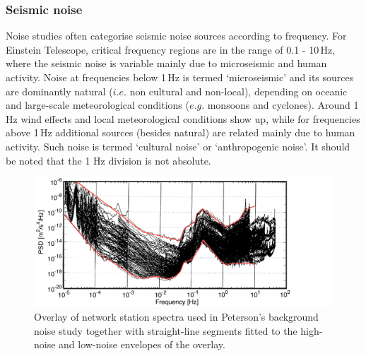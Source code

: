 \subsubsection{Seismic noise}
\label{SeismicNoise}
Noise studies \cite{Bard2003, Gutenberg1958, Asten1984, Peck2008} often categorise seismic noise sources according to frequency. For Einstein Telescope, critical frequency regions are in the range of 0.1 - 10\,Hz, where the seismic noise is variable mainly due to microseismic and human activity. Noise at frequencies below 1\,Hz is termed `microseismic' and its sources are dominantly natural ($i.e.$ non cultural and non-local), depending on oceanic and large-scale meteorological conditions ($e.g.$ monsoons and cyclones). Around 1\,Hz wind effects and local meteorological conditions show up, while for frequencies above 1\,Hz additional sources (besides natural) are related mainly due to human activity. Such noise is termed `cultural noise' or `anthropogenic noise'. It should be noted that the 1 Hz division is not absolute.
 \begin{figure}[h!]
	\begin{center}
		 \includegraphics[width=17cm]{./Sec_SiteInfra/Figures/peterson2.pdf}
			\caption{Overlay of network station spectra used in Peterson's background noise study \cite{Peterson1993} together with straight-line segments fitted to the high-noise and low-noise envelopes of the overlay.}		
			\label{fig3.1}
	\end{center}
\end{figure}

